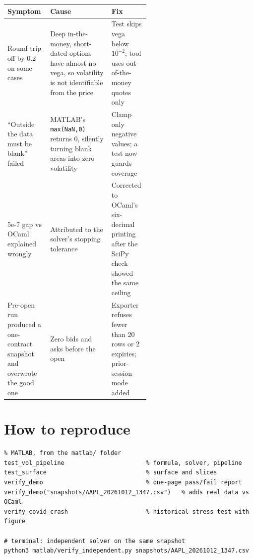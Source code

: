 \documentclass[11pt]{article}
\begin{document}
\begin{tabularx}{\linewidth}{@{}>{\raggedright\arraybackslash}p{0.3\linewidth}>{\raggedright\arraybackslash}X>{\raggedright\arraybackslash}p{0.27\linewidth}@{}}
\toprule
\textbf{Symptom} & \textbf{Cause} & \textbf{Fix}\\\midrule
Round trip off by 0.2 on some cases & Deep in-the-money, short-dated options have almost no vega, so volatility is not identifiable from the price & Test skips vega below $10^{-2}$; tool uses out-of-the-money quotes only\\
``Outside the data must be blank'' failed & MATLAB's \texttt{max(NaN,0)} returns 0, silently turning blank areas into zero volatility & Clamp only negative values; a test now guards coverage\\
5e-7 gap vs OCaml explained wrongly & Attributed to the solver's stopping tolerance & Corrected to OCaml's six-decimal printing after the SciPy check showed the same ceiling\\
Pre-open run produced a one-contract snapshot and overwrote the good one & Zero bids and asks before the open & Exporter refuses fewer than 20 rows or 2 expiries; prior-session mode added\\\bottomrule
\end{tabularx}

\section{How to reproduce}
\begin{lstlisting}
% MATLAB, from the matlab/ folder
test_vol_pipeline                       % formula, solver, pipeline
test_surface                            % surface and slices
verify_demo                             % one-page pass/fail report
verify_demo("snapshots/AAPL_20261012_1347.csv")   % adds real data vs OCaml
verify_covid_crash                      % historical stress test with figure

# terminal: independent solver on the same snapshot
python3 matlab/verify_independent.py snapshots/AAPL_20261012_1347.csv
\end{lstlisting}
\end{document}
